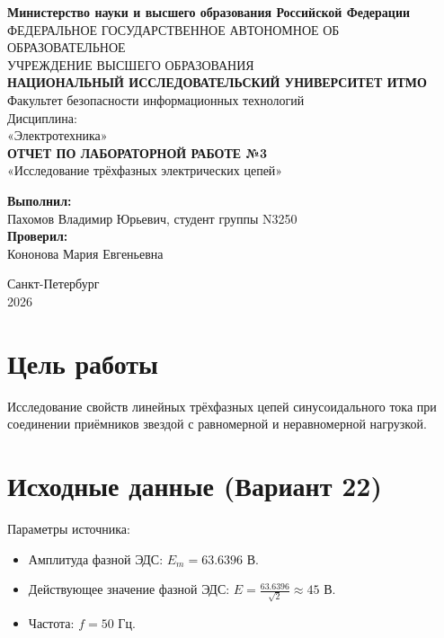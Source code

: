 \documentclass[a4paper,12pt]{article}
\begin{document}
\begin{titlepage}
    \centering
    \textbf{Министерство науки и высшего образования Российской Федерации}\\
    ФЕДЕРАЛЬНОЕ ГОСУДАРСТВЕННОЕ АВТОНОМНОЕ ОБ ОБРАЗОВАТЕЛЬНОЕ\\
    УЧРЕЖДЕНИЕ ВЫСШЕГО ОБРАЗОВАНИЯ\\
    \textbf{НАЦИОНАЛЬНЫЙ ИССЛЕДОВАТЕЛЬСКИЙ УНИВЕРСИТЕТ ИТМО}\\
    \vspace{1cm}
    Факультет безопасности информационных технологий\\
    \vspace{2cm}
    Дисциплина:\\
    «Электротехника»\\
    \vspace{2cm}
    \textbf{ОТЧЕТ ПО ЛАБОРАТОРНОЙ РАБОТЕ №3}\\
    «Исследование трёхфазных электрических цепей» \\
    \vspace{3cm}
    \begin{flushright}
        \textbf{Выполнил:}\\
        Пахомов Владимир Юрьевич, студент группы N3250\\
        \vspace{0.5cm}
        \textbf{Проверил:}\\
        Кононова Мария Евгеньевна\\
    \end{flushright}
    \vfill
    Санкт-Петербург\\
    2026
\end{titlepage}

\tableofcontents
\newpage

\section{Цель работы}
Исследование свойств линейных трёхфазных цепей синусоидального тока при соединении приёмников звездой с равномерной и неравномерной нагрузкой.

\section{Исходные данные (Вариант 22)}
Параметры источника:
\begin{itemize}
    \item Амплитуда фазной ЭДС: $E_m = 63.6396$ В.
    \item Действующее значение фазной ЭДС: $E = \frac{63.6396}{\sqrt{2}} \approx 45$ В.
    \item Частота: $f = 50$ Гц.
\end{itemize}
\end{document}
